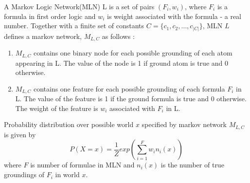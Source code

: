 \begin{defn}
	\label{MLNDef}
	A Markov Logic Network(MLN) L is a set of pairs $(F_i, w_i)$, where $F_i$ is a
	formula in first order logic and $w_i$ is weight associated with the formula - a real number.
	Together with a finite set of constants $C = \{c_1, c_2,\ldots,c_{|C|}\}$, MLN $L$
	defines a markov network, $M_{L,C}$ as follows :

	\begin{enumerate}
		\item $M_{L,C}$ contains one binary node for each possible grounding
			of each atom appearing in L. The value of the node is 1 if ground
			atom is true and 0 otherwise.
		\item $M_{L,C}$ contains one feature for each possible grounding of each
			formula $F_i$ in L. The value of the feature is 1 if the ground
			formula is true and 0 otherwise. The weight of the feature is
			$w_i$ associated with $F_i$ in L.
	\end{enumerate}
\end{defn}

Probability distribution over possible world $x$ specified by markov network $M_{L,C}$ is given by
\begin{equation}
	\label{jointDistMLN}
	P(X = x) = \frac{1}{Z} exp \left( \displaystyle \sum_{i = 1}^{F} w_i n_i(x)  \right)
\end{equation}
where $F$ is number of formulae in MLN and $n_i(x)$ is the number of true groundings of
$F_i$ in world $x$.
